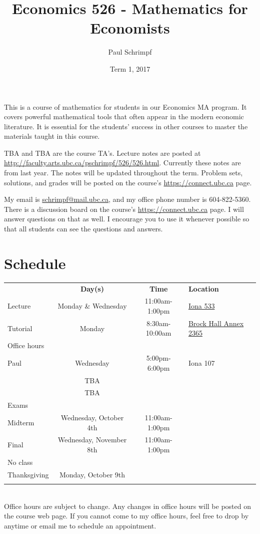 \documentclass[10pt]{article}
\title{Economics 526 - Mathematics for Economists}
\date{Term 1, 2017}
\author{Paul Schrimpf}
\begin{document}
\maketitle

This is a course of mathematics for students in our Economics MA
program. It covers powerful mathematical tools that often appear
in the modern economic literature. It is essential for the students'
success in other courses to master the materials taught in this
course.

TBA and TBA
are the course TA's.  Lecture notes are posted
at \url{http://faculty.arts.ubc.ca/pschrimpf/526/526.html}. Currently
these notes are from last year. The notes will be updated throughout
the term. Problem sets, solutions, and grades will be posted on the
course's \url{https://connect.ubc.ca} page.

My email is
\href{mailto:schrimp@mail.ubc.ca}{schrimpf@mail.ubc.ca}, and my office
phone number is 604-822-5360. There is a discussion board on the
course's \url{https://connect.ubc.ca} page. I will answer questions on
that as well. I encourage you to use it whenever possible so that
all students can see the questions and answers.

\section{Schedule}
\begin{tabular}{l c c l}
  \hline 
  & \textbf{Day(s)} & \textbf{Time} & \textbf{Location} \\
  Lecture & Monday \& Wednesday & 11:00am-1:00pm & \href{https://ssc.adm.ubc.ca/classroomservices/function/viewlocation?userEvent=ShowLocation&buildingID=IONA&roomID=533}{Iona 533} \\
  Tutorial & Monday & 8:30am-10:00am &
  \href{https://ssc.adm.ubc.ca/classroomservices/function/viewlocation?userEvent=ShowLocation&buildingID=BRKX&roomID=2365}
  {Brock Hall Annex 2365}  \\
  Office hours \\
  \; Paul & Wednesday & 5:00pm-6:00pm & Iona 107 \\
  \;  & TBA & & \\ 
  \;  & TBA & & \\ \hline
  Exams \\
  \; Midterm & Wednesday, October 4th & 11:00am-1:00pm &
                                                         \\
  \; Final & Wednesday, November 8th & 11:00am-1:00pm &
                                                         \\
  No class \\
  \; Thanksgiving & Monday, October 9th \\
  \\ \hline 
\end{tabular} \\
Office hours are subject to change. Any changes in office hours will
be posted on the course web page. If you cannot come to my office
hours, feel free to drop by anytime or email me to schedule an
appointment.  
\end{document}
